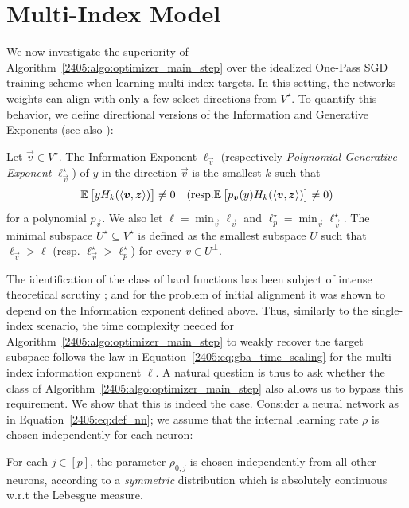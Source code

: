 \section{Multi-Index Model}
We now investigate the superiority of Algorithm~\ref{2405:algo:optimizer_main_step} over the idealized One-Pass SGD training scheme when learning multi-index targets. In this setting, the networks weights can align with only a few select directions from $V^\star$. To quantify this behavior, we define directional versions of the Information and Generative Exponents (see also \citep{troiani2024fundamental}):
\begin{definition}\label{2405:def:ie_pge_multi}
    Let $\vec{v}\in V^\star$. The Information Exponent $\ell_{\vec{v}}$ (respectively \emph{Polynomial Generative Exponent} $\ell^\star_{\vec{v}}$) of $y$ in the direction $\vec v$ is the smallest $k$ such that
    \[ \mathbb{E}\left[yH_k(\langle {\boldsymbol{v}}, {\boldsymbol{z}} \rangle)\right] \neq 0 \quad (\text{resp.}   \mathbb{E}\left[p_{{\boldsymbol{v}}}(y)H_k(\langle {\boldsymbol{v}}, {\boldsymbol{z}} \rangle)\right] \neq 0 ) \]
    for a polynomial $p_{\vec{v}}$. We also let $\ell = \min_{\vec{v}}\ell_{\vec{v}}$ and $\ell_p^\star = \min_{\vec{v}}\ell^\star_{\vec{v}}$.  The minimal subspace $U^\star \subseteq V^\star$ is defined as the smallest subspace $U$ such that $\ell_\vec{v} > \ell$ (resp. $\ell_{\vec{v}}^\star > \ell_p^\star$) for every $v\in U^\bot$.
\end{definition}
The identification of the class of hard functions has been subject of intense theoretical scrutiny \citep{abbe2021staircase,abbe2022merged,abbe2023sgd,dandi2023how,bietti2023learning,troiani2024fundamental}; and for the problem of initial alignment it was shown to depend on the Information exponent defined above. 
Thus, similarly to the single-index scenario, the time complexity needed for Algorithm~\ref{2405:algo:optimizer_main_step} to weakly recover the target subspace follows the law in Equation~\eqref{2405:eq:gba_time_scaling} for the multi-index information exponent $\ell$. A natural question is thus to ask whether the class of Algorithm~\ref{2405:algo:optimizer_main_step} also allows us to bypass this requirement. We show that this is indeed the case. Consider a neural network as in Equation~\eqref{2405:eq:def_nn}; we assume that the internal learning rate $\rho$ is chosen independently for each neuron:
\begin{assumption}
    For each $j \in [p]$, the parameter $\rho_{0, j}$ is chosen independently from all other neurons, according to a \emph{symmetric} distribution which is absolutely continuous w.r.t the Lebesgue measure.
\end{assumption}

